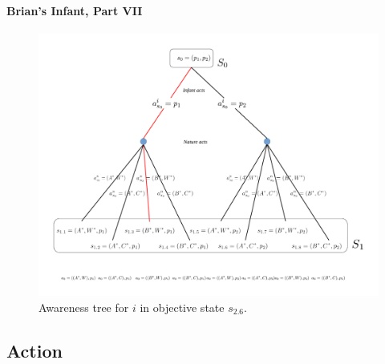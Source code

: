 \documentclass[
11pt,
titlepage,
reqno,
]{article}%
\theoremstyle{definition}
\begin{document}
\paragraph{Brian's Infant, Part VII}
\begin{figure}[h!]
	\centering
	\includegraphics*[page=8,trim = 3in 0in 1in 0in,scale=.7]{Awareness_Diagrams_All}
	\caption{Awareness tree for $i$ in objective state $s_{2.6}$.\label{Diag: p-08}}%
\end{figure}



\subsection{Action}
\end{document}
